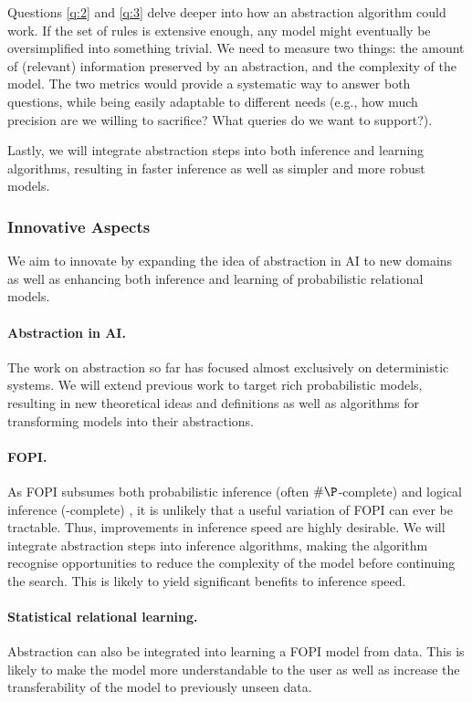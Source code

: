\documentclass{article}
\begin{document}
Questions \ref{q:2} and \ref{q:3} delve deeper into how an abstraction algorithm
could work. If the set of rules is extensive enough, any model might
eventually be oversimplified into something trivial. We need to measure two
things: the amount of (relevant) information preserved by an abstraction, and
the complexity of the model. The two metrics would provide a systematic way to
answer both questions, while being easily adaptable to different needs (e.g.,
how much precision are we willing to sacrifice? What queries do we want to
support?).

Lastly, we will integrate abstraction steps into both inference and learning
algorithms, resulting in faster inference as well as simpler and more robust
models.

\subsubsection{Innovative Aspects}

We aim to innovate by expanding the idea of abstraction in AI to new domains as
well as enhancing both inference and learning of probabilistic relational
models.

\paragraph{Abstraction in AI.} The work on abstraction so far has focused almost
exclusively on deterministic systems. We will extend previous work to target
rich probabilistic models, resulting in new theoretical ideas and definitions as
well as algorithms for transforming models into their abstractions.

\paragraph{FOPI.} As FOPI subsumes both probabilistic inference (often
$\#\P$-complete) and logical inference (\NP-complete)
\cite{DBLP:journals/ml/RichardsonD06}, it is unlikely that a useful variation of
FOPI can ever be tractable. Thus, improvements in inference speed are highly
desirable. We will integrate abstraction steps into inference algorithms,
making the algorithm recognise opportunities to reduce the complexity of the
model before continuing the search. This is likely to yield significant benefits
to inference speed.

\paragraph{Statistical relational learning.} Abstraction can also be integrated
into learning a FOPI model from data. This is likely to make the model more
understandable to the user as well as increase the transferability of the model
to previously unseen data.
\end{document}
